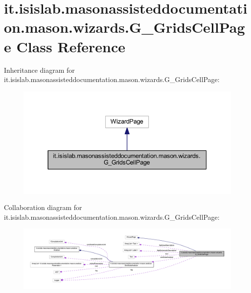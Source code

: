 \hypertarget{classit_1_1isislab_1_1masonassisteddocumentation_1_1mason_1_1wizards_1_1_g___grids_cell_page}{\section{it.\-isislab.\-masonassisteddocumentation.\-mason.\-wizards.\-G\-\_\-\-Grids\-Cell\-Page Class Reference}
\label{classit_1_1isislab_1_1masonassisteddocumentation_1_1mason_1_1wizards_1_1_g___grids_cell_page}
}


Inheritance diagram for it.\-isislab.\-masonassisteddocumentation.\-mason.\-wizards.\-G\-\_\-\-Grids\-Cell\-Page\-:\nopagebreak
\begin{figure}[H]
\begin{center}
\leavevmode
\includegraphics[width=337pt]{classit_1_1isislab_1_1masonassisteddocumentation_1_1mason_1_1wizards_1_1_g___grids_cell_page__inherit__graph}
\end{center}
\end{figure}


Collaboration diagram for it.\-isislab.\-masonassisteddocumentation.\-mason.\-wizards.\-G\-\_\-\-Grids\-Cell\-Page\-:\nopagebreak
\begin{figure}[H]
\begin{center}
\leavevmode
\includegraphics[width=350pt]{classit_1_1isislab_1_1masonassisteddocumentation_1_1mason_1_1wizards_1_1_g___grids_cell_page__coll__graph}
\end{center}
\end{figure}
